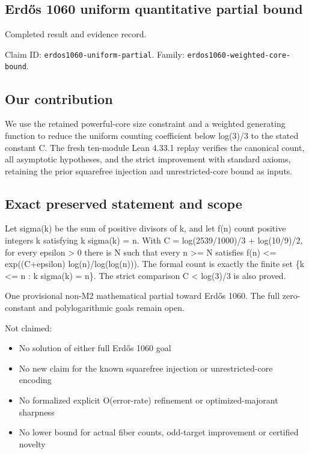 \documentclass[11pt,a4paper]{article}
\begin{document}
\subsection{Erdős 1060 uniform quantitative partial bound}
Completed result and evidence record.

Claim ID: \texttt{erdos1060-uniform-partial}. Family: \texttt{erdos1060-weighted-core-bound}.

\subsection{Our contribution}
We use the retained powerful-core size constraint and a weighted generating function to reduce the uniform counting coefficient below log(3)/3 to the stated constant C. The fresh ten-module Lean 4.33.1 replay verifies the canonical count, all asymptotic hypotheses, and the strict improvement with standard axioms, retaining the prior squarefree injection and unrestricted-core bound as inputs.

\subsection{Exact preserved statement and scope}
Let sigma(k) be the sum of positive divisors of k, and let f(n) count positive integers k satisfying k sigma(k) = n. With C = log(2539/1000)/3 + log(10/9)/2, for every epsilon > 0 there is N such that every n >= N satisfies f(n) <= exp((C+epsilon) log(n)/log(log(n))). The formal count is exactly the finite set \{k <= n : k sigma(k) = n\}. The strict comparison C < log(3)/3 is also proved.

One provisional non-M2 mathematical partial toward Erdős 1060. The full zero-constant and polylogarithmic goals remain open.

Not claimed:

\begin{itemize}
\item No solution of either full Erdős 1060 goal
\end{itemize}
\begin{itemize}
\item No new claim for the known squarefree injection or unrestricted-core encoding
\end{itemize}
\begin{itemize}
\item No formalized explicit O(error-rate) refinement or optimized-majorant sharpness
\end{itemize}
\begin{itemize}
\item No lower bound for actual fiber counts, odd-target improvement or certified novelty
\end{itemize}
\end{document}
